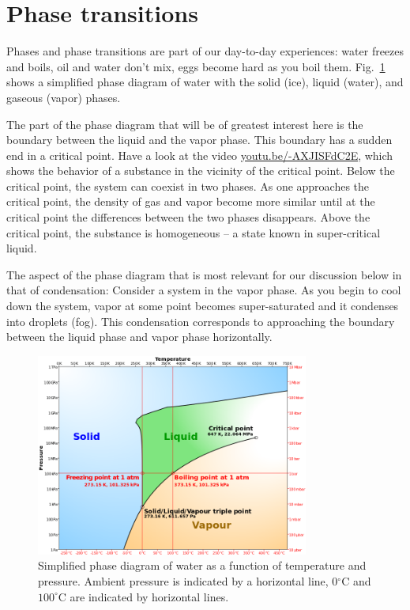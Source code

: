 \section{Phase transitions}
Phases and phase transitions are part of our day-to-day experiences: water freezes and boils, oil and water don't mix, eggs become hard as you boil them.
Fig.~\ref{fig:h2o_phases} shows a simplified phase diagram of water with the solid (ice), liquid (water), and gaseous (vapor) phases.

The part of the phase diagram that will be of greatest interest here is the boundary between the liquid and the vapor phase.
This boundary has a sudden end in a critical point.
Have a look at the video \href{https://youtu.be/-AXJISFdC2E}{youtu.be/-AXJISFdC2E}, which shows the behavior of a substance in the vicinity of the critical point.
Below the critical point, the system can coexist in two phases.
As one approaches the critical point, the density of gas and vapor become more similar until at the critical point the differences between the two phases disappears.
Above the critical point, the substance is homogeneous -- a state known in super-critical liquid.

The aspect of the phase diagram that is most relevant for our discussion below in that of condensation: Consider a system in the vapor phase. As you begin to cool down the system, vapor at some point becomes super-saturated and it condenses into droplets (fog).
This condensation corresponds to approaching the boundary between the liquid phase and vapor phase horizontally.

\begin{figure}[tb]
	\centering
	\includegraphics[width=0.8\textwidth]{figures/Phase_diagram_of_water_simplified.png}
	\caption{Simplified phase diagram of water as a function of temperature and pressure. Ambient pressure is indicated by a horizontal line, 0$^\circ$C and $100^{\circ}$C are indicated by horizontal lines.}
	\label{fig:h2o_phases}
\end{figure}


